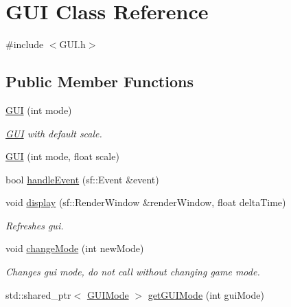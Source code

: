 \hypertarget{classGUI}{\section{G\-U\-I Class Reference}
\label{classGUI}
}


{\ttfamily \#include $<$G\-U\-I.\-h$>$}

\subsection*{Public Member Functions}
\begin{DoxyCompactItemize}
\item 
\hyperlink{classGUI_a43b90b8b0773bf9d3e9f2ac85a83b0a4}{G\-U\-I} (int mode)
\begin{DoxyCompactList}\small\item\em \hyperlink{classGUI}{G\-U\-I} with default scale. \end{DoxyCompactList}\item 
\hyperlink{classGUI_aa7e20a80c9eaba0c07526e37d3662840}{G\-U\-I} (int mode, float scale)
\item 
bool \hyperlink{classGUI_ade522dd36065824fb0b1196e288906a8}{handle\-Event} (sf\-::\-Event \&event)
\item 
\hypertarget{classGUI_a61360fb51a703e35f86530bb8fb00b42}{void \hyperlink{classGUI_a61360fb51a703e35f86530bb8fb00b42}{display} (sf\-::\-Render\-Window \&render\-Window, float delta\-Time)}\label{classGUI_a61360fb51a703e35f86530bb8fb00b42}

\begin{DoxyCompactList}\small\item\em Refreshes gui. \end{DoxyCompactList}\item 
\hypertarget{classGUI_a693d2446309a4e36f06ee778a313471b}{void \hyperlink{classGUI_a693d2446309a4e36f06ee778a313471b}{change\-Mode} (int new\-Mode)}\label{classGUI_a693d2446309a4e36f06ee778a313471b}

\begin{DoxyCompactList}\small\item\em Changes gui mode, do not call without changing game mode. \end{DoxyCompactList}\item 
\hypertarget{classGUI_a6cd2962793721d6da4ad88ef5969ce6f}{std\-::shared\-\_\-ptr$<$ \hyperlink{classGUIMode}{G\-U\-I\-Mode} $>$ \hyperlink{classGUI_a6cd2962793721d6da4ad88ef5969ce6f}{get\-G\-U\-I\-Mode} (int gui\-Mode)}\label{classGUI_a6cd2962793721d6da4ad88ef5969ce6f}


\end{DoxyCompactItemize}
